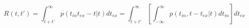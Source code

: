 \begin{equation}
R(t,t') = \int_{t+t'}^\infty p(t_{in}t_{ex}-t|t) dt_{ex}  = \int_{t+t'}^\infty \left[ \int_{-\infty}^\infty p(t_{in},t-t_{ex}|t) dt_{in} \right]  dt_{ex}
\end{equation}